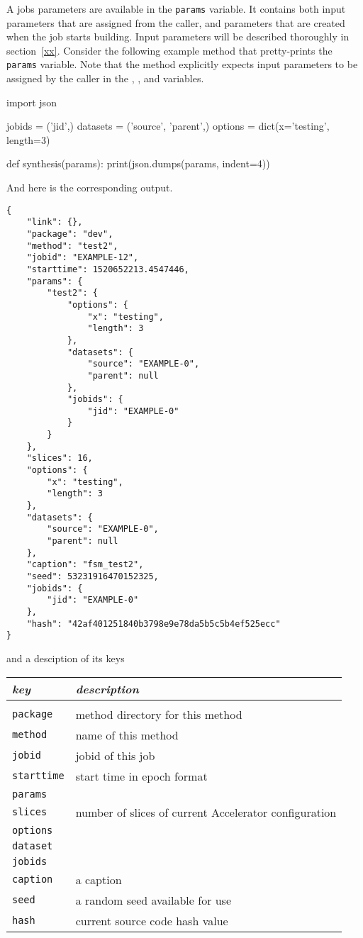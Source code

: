 A jobs parameters are available in the \texttt{params} variable.  It
contains both input parameters that are assigned from the caller, and
parameters that are created when the job starts building.  Input
parameters will be described thoroughly in section~\ref{xx}.  Consider
the following example method that pretty-prints the \texttt{params}
variable.  Note that the method explicitly expects input parameters to
be assigned by the caller in the \jobids, \datasets, and \options
variables.

\begin{python}
import json

jobids = ('jid',)
datasets = ('source', 'parent',)
options = dict(x='testing', length=3)

def synthesis(params):
    print(json.dumps(params, indent=4))
\end{python}
And here is the corresponding output.
\begin{leftbar}
\begin{verbatim}
{
    "link": {},
    "package": "dev",
    "method": "test2",
    "jobid": "EXAMPLE-12",
    "starttime": 1520652213.4547446,
    "params": {
        "test2": {
            "options": {
                "x": "testing",
                "length": 3
            },
            "datasets": {
                "source": "EXAMPLE-0",
                "parent": null
            },
            "jobids": {
                "jid": "EXAMPLE-0"
            }
        }
    },
    "slices": 16,
    "options": {
        "x": "testing",
        "length": 3
    },
    "datasets": {
        "source": "EXAMPLE-0",
        "parent": null
    },
    "caption": "fsm_test2",
    "seed": 53231916470152325,
    "jobids": {
        "jid": "EXAMPLE-0"
    },
    "hash": "42af401251840b3798e9e78da5b5c5b4ef525ecc"
}
\end{verbatim}
\end{leftbar}
and a desciption of its keys
\begin{snugshade}
\begin{tabular}{ll}
  \textsl{key} & \textsl{description}\\[2ex]\hline\\[1ex]
  \texttt{package} & method directory for this method\\
  \texttt{method} & name of this method\\
  \texttt{jobid} & jobid of this job\\
  \texttt{starttime}& start time in epoch format\\
  \texttt{params} & \\
  \texttt{slices} & number of slices of current Accelerator configuration \\
  \texttt{options} & \\
  \texttt{dataset} & \\
  \texttt{jobids} & \\
  \texttt{caption} & a caption\\
  \texttt{seed} & a random seed available for use\\
  \texttt{hash} & current source code hash value\\
\end{tabular}
\end{snugshade}
